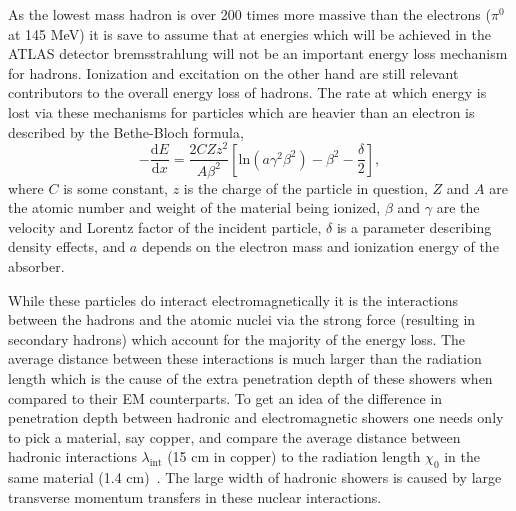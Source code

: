 As the lowest mass hadron is over 200 times more massive than the electrons ($\pi^{0}$ at 145 MeV) it is save to assume that at energies which will be achieved in the ATLAS detector bremsstrahlung will not be an important energy loss mechanism for hadrons.  
Ionization and excitation on the other hand are still relevant contributors to the overall energy loss of hadrons.  
The rate at which energy is lost via these mechanisms for particles which are heavier than an electron is described by the Bethe-Bloch formula,  
\begin{equation}
-\frac{\mathrm{d}E}{\mathrm{d}x}=\frac{2CZz^2}{A\beta^2}\left[\mathrm{ln}\left(a\gamma^2\beta^2\right)-\beta^2-\frac{\delta}{2}\right], 
\end{equation}
where $C$ is some constant, $z$ is the charge of the particle in question, $Z$ and $A$ are the atomic number and weight of the material being ionized, $\beta$ and $\gamma$ are the velocity and Lorentz factor of the incident particle, $\delta$ is a parameter describing density effects, and $a$ depends on the electron mass and ionization energy of the absorber.  

While these particles do interact electromagnetically it is the interactions between the hadrons and the atomic nuclei via the strong force (resulting in secondary hadrons) which account for the majority of the energy loss.  
The average distance between these interactions is much larger than the radiation length which is the cause of the extra penetration depth of these showers when compared to their EM counterparts.  
To get an idea of the difference in penetration depth between hadronic and electromagnetic showers one needs only to pick a material, say copper, and compare the average distance between hadronic interactions $\lambda_{\mathrm{int}}$ (15 cm in copper) to the radiation length $\chi_{0}$ in the same material (1.4 cm)~\cite{Wigmans2008}.  
The large width of hadronic showers is caused by large transverse momentum transfers in these nuclear interactions.  

